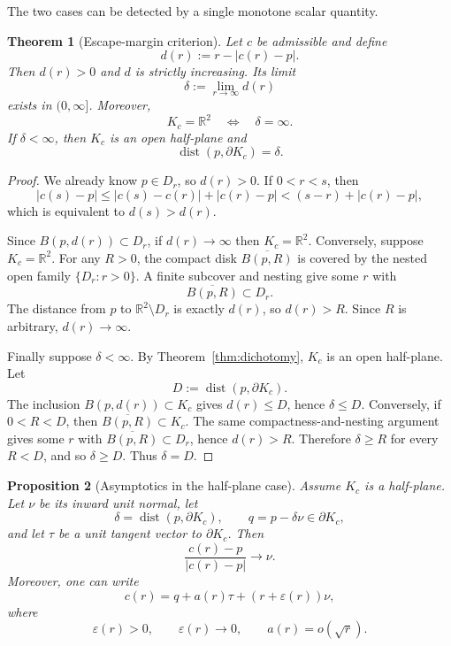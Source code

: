\documentclass[11pt]{article}
\newtheorem{theorem}{Theorem}[section]
\newtheorem{proposition}[theorem]{Proposition}
\newcommand{\R}{\mathbb{R}}
\newcommand{\ol}{\overline}
\DeclareMathOperator{\dist}{dist}
\begin{document}
The two cases can be detected by a single monotone scalar quantity.

\begin{theorem}[Escape-margin criterion]\label{thm:escape}
Let $c$ be admissible and define
\[
d(r):=r-|c(r)-p|.
\]
Then $d(r)>0$ and $d$ is strictly increasing. Its limit
\[
\delta:=\lim_{r\to\infty}d(r)
\]
exists in $(0,\infty]$. Moreover,
\[
K_c=\R^2
\quad\Longleftrightarrow\quad
\delta=\infty.
\]
If $\delta<\infty$, then $K_c$ is an open half-plane and
\[
\dist(p,\partial K_c)=\delta.
\]
\end{theorem}

\begin{proof}
We already know $p\in D_r$, so $d(r)>0$. If $0<r<s$, then
\[
|c(s)-p|
\le |c(s)-c(r)|+|c(r)-p|
<(s-r)+|c(r)-p|,
\]
which is equivalent to $d(s)>d(r)$.

Since $B(p,d(r))\subset D_r$, if $d(r)\to\infty$ then $K_c=\R^2$.
Conversely, suppose $K_c=\R^2$. For any $R>0$, the compact disk $\ol{B(p,R)}$ is covered by the nested open family $\{D_r:r>0\}$. A finite subcover and nesting give some $r$ with
\[
\ol{B(p,R)}\subset D_r.
\]
The distance from $p$ to $\R^2\setminus D_r$ is exactly $d(r)$, so $d(r)>R$. Since $R$ is arbitrary, $d(r)\to\infty$.

Finally suppose $\delta<\infty$. By Theorem~\ref{thm:dichotomy}, $K_c$ is an open half-plane. Let
\[
D:=\dist(p,\partial K_c).
\]
The inclusion $B(p,d(r))\subset K_c$ gives $d(r)\le D$, hence $\delta\le D$. Conversely, if $0<R<D$, then $\ol{B(p,R)}\subset K_c$. The same compactness-and-nesting argument gives some $r$ with $\ol{B(p,R)}\subset D_r$, hence $d(r)>R$. Therefore $\delta\ge R$ for every $R<D$, and so $\delta\ge D$. Thus $\delta=D$.
\end{proof}

\begin{proposition}[Asymptotics in the half-plane case]\label{prop:asymptotic}
Assume $K_c$ is a half-plane. Let $\nu$ be its inward unit normal, let
\[
\delta=\dist(p,\partial K_c),
\qquad
q=p-\delta\nu\in\partial K_c,
\]
and let $\tau$ be a unit tangent vector to $\partial K_c$. Then
\[
\frac{c(r)-p}{|c(r)-p|}\longrightarrow\nu.
\]
Moreover, one can write
\[
c(r)=q+a(r)\tau+(r+\varepsilon(r))\nu,
\]
where
\[
\varepsilon(r)>0,
\qquad
\varepsilon(r)\to0,
\qquad
a(r)=o(\sqrt r).
\]
\end{proposition}
\end{document}
